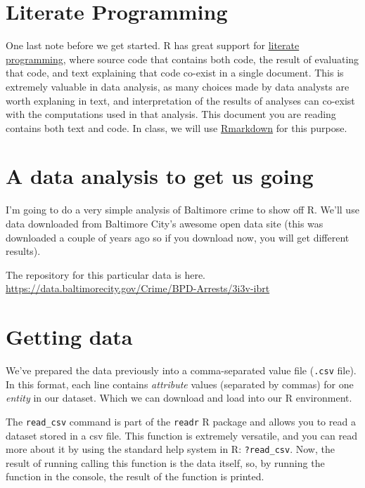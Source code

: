 \documentclass[]{book}
\theoremstyle{definition}
\theoremstyle{definition}
\theoremstyle{remark}
\begin{document}
\section{Literate Programming}\label{literate-programming}

One last note before we get started. R has great support for
\href{http://en.wikipedia.org/wiki/Literate_programming}{literate
programming}, where source code that contains both code, the result of
evaluating that code, and text explaining that code co-exist in a single
document. This is extremely valuable in data analysis, as many choices
made by data analysts are worth explaning in text, and interpretation of
the results of analyses can co-exist with the computations used in that
analysis. This document you are reading contains both text and code. In
class, we will use \href{http://rmarkdown.rstudio.com/}{Rmarkdown} for
this purpose.

\section{A data analysis to get us
going}\label{a-data-analysis-to-get-us-going}

I'm going to do a very simple analysis of Baltimore crime to show off R.
We'll use data downloaded from Baltimore City's awesome open data site
(this was downloaded a couple of years ago so if you download now, you
will get different results).

The repository for this particular data is here.
\url{https://data.baltimorecity.gov/Crime/BPD-Arrests/3i3v-ibrt}

\section{Getting data}\label{getting-data}

We've prepared the data previously into a comma-separated value file
(\texttt{.csv} file). In this format, each line contains
\emph{attribute} values (separated by commas) for one \emph{entity} in
our dataset. Which we can download and load into our R environment.

The \texttt{read\_csv} command is part of the \texttt{readr} R package
and allows you to read a dataset stored in a csv file. This function is
extremely versatile, and you can read more about it by using the
standard help system in R: \texttt{?read\_csv}. Now, the result of
running calling this function is the data itself, so, by running the
function in the console, the result of the function is printed.
\end{document}
